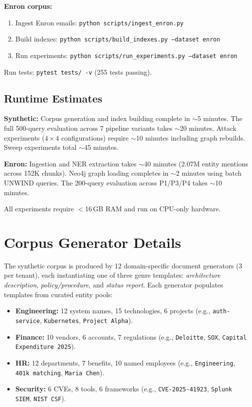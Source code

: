 \documentclass[letterpaper,twocolumn,10pt]{article}
\begin{document}
\textbf{Enron corpus:}
\begin{enumerate}
\item Ingest Enron emails: \texttt{python scripts/ingest\_enron.py}
\item Build indexes: \texttt{python scripts/build\_indexes.py
  --dataset enron}
\item Run experiments: \texttt{python scripts/run\_experiments.py
  --dataset enron}
\end{enumerate}

\noindent Run tests: \texttt{pytest tests/ -v} (255 tests passing).

\subsection{Runtime Estimates}

\textbf{Synthetic:} Corpus generation and index building complete in
$\sim$5 minutes.  The full 500-query evaluation across 7 pipeline
variants takes $\sim$20 minutes.  Attack experiments
($4 \times 4$ configurations) require $\sim$10 minutes including graph
rebuilds. Sweep experiments total $\sim$45 minutes.

\textbf{Enron:} Ingestion and NER extraction takes $\sim$40 minutes
(2.07M entity mentions across 152K chunks). Neo4j graph loading
completes in $\sim$2 minutes using batch UNWIND queries. The 200-query
evaluation across P1/P3/P4 takes $\sim$10 minutes.

All experiments require $<$16\,GB RAM and run on CPU-only hardware.

\section{Corpus Generator Details}
\label{sec:corpus-details}

The synthetic corpus is produced by 12 domain-specific document
generators (3 per tenant), each instantiating one of three genre
templates: \emph{architecture description}, \emph{policy/procedure},
and \emph{status report}. Each generator populates templates from
curated entity pools:

\begin{itemize}
\item \textbf{Engineering:} 12 system names, 15 technologies, 6
  projects (e.g., \texttt{auth-service}, \texttt{Kubernetes},
  \texttt{Project Alpha}).
\item \textbf{Finance:} 10 vendors, 6 accounts, 7 regulations
  (e.g., \texttt{Deloitte}, \texttt{SOX}, \texttt{Capital Expenditure
  2025}).
\item \textbf{HR:} 12 departments, 7 benefits, 10 named employees
  (e.g., \texttt{Engineering}, \texttt{401k matching}, \texttt{Maria
  Chen}).
\item \textbf{Security:} 6 CVEs, 8 tools, 6 frameworks
  (e.g., \texttt{CVE-2025-41923}, \texttt{Splunk SIEM}, \texttt{NIST
  CSF}).
\end{itemize}
\end{document}
